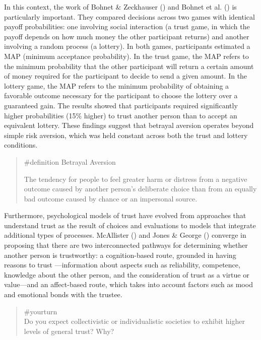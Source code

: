 \documentclass[
  letterpaper,
]{book}
\begin{document}
In this context, the work of Bohnet \& Zeckhauser
() and Bohnet et al.
() is particularly important.
They compared decisions across two games with identical payoff
probabilities: one involving social interaction (a trust game, in which
the payoff depends on how much money the other participant returns) and
another involving a random process (a lottery). In both games,
participants estimated a MAP (minimum acceptance probability). In the
trust game, the MAP refers to the minimum probability that the other
participant will return a certain amount of money required for the
participant to decide to send a given amount. In the lottery game, the
MAP refers to the minimum probability of obtaining a favorable outcome
necessary for the participant to choose the lottery over a guaranteed
gain. The results showed that participants required significantly higher
probabilities (15\% higher) to trust another person than to accept an
equivalent lottery. These findings suggest that betrayal aversion
operates beyond simple risk aversion, which was held constant across
both the trust and lottery conditions.

\begin{quote}
\label{def-betrayalaversion}{\#definition} Betrayal
Aversion

The tendency for people to feel greater harm or distress from a negative
outcome caused by another person's deliberate choice than from an
equally bad outcome caused by chance or an impersonal source.
\end{quote}

Furthermore, psychological models of trust have evolved from approaches
that understand trust as the result of choices and evaluations to models
that integrate additional types of processes. McAllister
() and Jones \& George
() converge in proposing that
there are two interconnected pathways for determining whether another
person is trustworthy: a cognition-based route, grounded in having
reasons to trust ---information about aspects such as reliability,
competence, knowledge about the other person, and the consideration of
trust as a virtue or value---and an affect-based route, which takes into
account factors such as mood and emotional bonds with the trustee.

\begin{quote}
{\#yourturn}\\
Do you expect collectivistic or individualistic societies to exhibit
higher levels of general trust? Why?
\end{quote}
\end{document}
